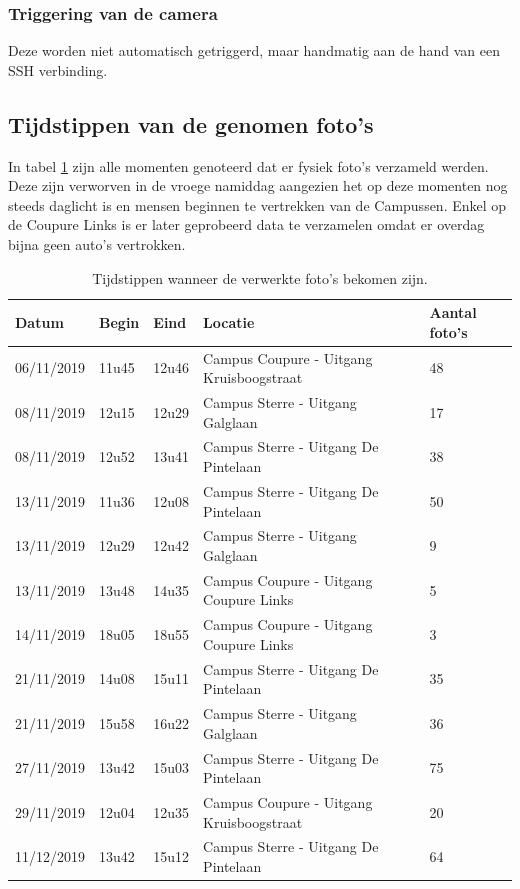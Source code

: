 \subsubsection{Triggering van de camera}
Deze worden niet automatisch getriggerd, maar handmatig aan de hand van een SSH verbinding.

\subsection{Tijdstippen van de genomen foto's}
In tabel \ref{tab:fototijdstippen} zijn alle momenten genoteerd dat er fysiek foto's verzameld werden. Deze zijn verworven in de vroege namiddag aangezien het op deze momenten nog steeds daglicht is en mensen beginnen te vertrekken van de Campussen. Enkel op de Coupure Links is er later geprobeerd data te verzamelen omdat er overdag bijna geen auto's vertrokken.
\begin{table}[h!]
\centering
\begin{tabular}{l|l|l|l|l}
	Datum 		& Begin & Eind	& Locatie	& Aantal foto's \\ \hline
	06/11/2019	& 11u45 & 12u46	& Campus Coupure - Uitgang Kruisboogstraat	& 48	\\
	08/11/2019	& 12u15 & 12u29	& Campus Sterre - Uitgang Galglaan	& 17	\\
	08/11/2019	& 12u52 & 13u41	& Campus Sterre - Uitgang De Pintelaan	& 38	\\
	13/11/2019	& 11u36 & 12u08	& Campus Sterre - Uitgang De Pintelaan	& 50	\\
	13/11/2019	& 12u29 & 12u42	& Campus Sterre - Uitgang Galglaan	& 9	\\
	13/11/2019	& 13u48 & 14u35	& Campus Coupure - Uitgang Coupure Links	& 5	\\
	14/11/2019	& 18u05 & 18u55	& Campus Coupure - Uitgang Coupure Links	& 3	\\
	21/11/2019	& 14u08 & 15u11	& Campus Sterre - Uitgang De Pintelaan	& 35	\\
	21/11/2019	& 15u58 & 16u22	& Campus Sterre - Uitgang Galglaan	& 36	\\
	27/11/2019	& 13u42 & 15u03	& Campus Sterre - Uitgang De Pintelaan	& 75	\\
	29/11/2019	& 12u04 & 12u35	& Campus Coupure - Uitgang Kruisboogstraat	& 20	\\
	11/12/2019	& 13u42 & 15u12	& Campus Sterre - Uitgang De Pintelaan	& 64	\\
\end{tabular}
\caption{Tijdstippen wanneer de verwerkte foto's bekomen zijn.}
\label{tab:fototijdstippen}
\end{table}

